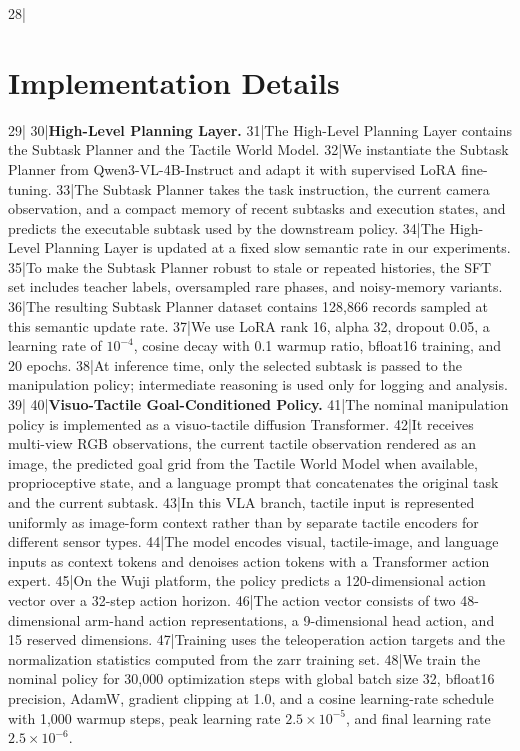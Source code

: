 28|\section{Implementation Details}
29|
30|\noindent\textbf{High-Level Planning Layer.}
31|The High-Level Planning Layer contains the Subtask Planner and the Tactile World Model.
32|We instantiate the Subtask Planner from Qwen3-VL-4B-Instruct and adapt it with supervised LoRA fine-tuning.
33|The Subtask Planner takes the task instruction, the current camera observation, and a compact memory of recent subtasks and execution states, and predicts the executable subtask used by the downstream policy.
34|The High-Level Planning Layer is updated at a fixed slow semantic rate in our experiments.
35|To make the Subtask Planner robust to stale or repeated histories, the SFT set includes teacher labels, oversampled rare phases, and noisy-memory variants.
36|The resulting Subtask Planner dataset contains 128,866 records sampled at this semantic update rate.
37|We use LoRA rank 16, alpha 32, dropout 0.05, a learning rate of $10^{-4}$, cosine decay with 0.1 warmup ratio, bfloat16 training, and 20 epochs.
38|At inference time, only the selected subtask is passed to the manipulation policy; intermediate reasoning is used only for logging and analysis.
39|
40|\noindent\textbf{Visuo-Tactile Goal-Conditioned Policy.}
41|The nominal manipulation policy is implemented as a visuo-tactile diffusion Transformer.
42|It receives multi-view RGB observations, the current tactile observation rendered as an image, the predicted goal grid from the Tactile World Model when available, proprioceptive state, and a language prompt that concatenates the original task and the current subtask.
43|In this VLA branch, tactile input is represented uniformly as image-form context rather than by separate tactile encoders for different sensor types.
44|The model encodes visual, tactile-image, and language inputs as context tokens and denoises action tokens with a Transformer action expert.
45|On the Wuji platform, the policy predicts a 120-dimensional action vector over a 32-step action horizon.
46|The action vector consists of two 48-dimensional arm-hand action representations, a 9-dimensional head action, and 15 reserved dimensions.
47|Training uses the teleoperation action targets and the normalization statistics computed from the zarr training set.
48|We train the nominal policy for 30,000 optimization steps with global batch size 32, bfloat16 precision, AdamW, gradient clipping at 1.0, and a cosine learning-rate schedule with 1,000 warmup steps, peak learning rate $2.5\times10^{-5}$, and final learning rate $2.5\times10^{-6}$.
